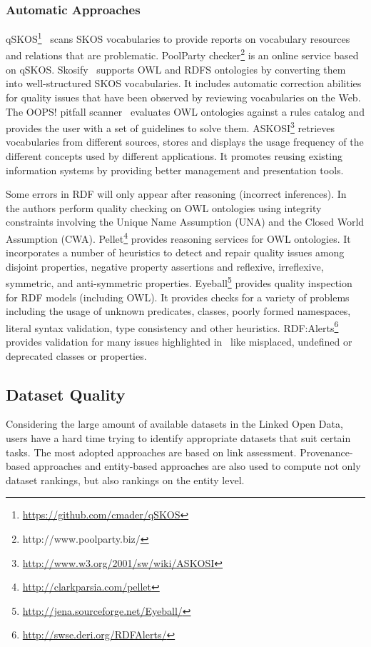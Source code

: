 \documentclass[onecolumn, crcready]{../../Util/LaTEX/iosart2c}
\begin{document}
\subsubsection{Automatic Approaches}
qSKOS\footnote{\url{https://github.com/cmader/qSKOS}}~\cite{Mader:TBDL:12} scans SKOS vocabularies to provide reports on vocabulary resources and relations that are problematic. PoolParty checker\footnote{http://www.poolparty.biz/} is an online service based on qSKOS. Skosify~\cite{Suominen:IKEM:12} supports OWL and RDFS ontologies by converting them into well-structured SKOS vocabularies. It includes automatic correction abilities for quality issues that have been observed by reviewing vocabularies on the Web. The OOPS! pitfall scanner~\cite{PovedaVillalon:EKAW:12} evaluates OWL ontologies against a rules catalog and provides the user with a set of guidelines to solve them. ASKOSI\footnote{\url{http://www.w3.org/2001/sw/wiki/ASKOSI}} retrieves vocabularies from different sources, stores and displays the usage frequency of the different concepts used by different applications. It promotes reusing existing information systems by providing better management and presentation tools.

Some errors in RDF will only appear after reasoning (incorrect inferences). In~\cite{Sirin:OWLED:08,Tao:HICSS:09} the authors perform quality checking on OWL ontologies using integrity constraints involving the Unique Name Assumption (UNA) and the Closed World Assumption (CWA). Pellet\footnote{\url{http://clarkparsia.com/pellet}} provides reasoning services for OWL ontologies. It incorporates a number of heuristics to detect and repair quality issues among disjoint properties, negative property assertions and reflexive, irreflexive, symmetric, and anti-symmetric properties. Eyeball\footnote{\url{http://jena.sourceforge.net/Eyeball/}} provides quality inspection for RDF models (including OWL). It provides checks for a variety of problems including the usage of unknown predicates, classes, poorly formed namespaces, literal syntax validation, type consistency and other heuristics. RDF:Alerts\footnote{\url{http://swse.deri.org/RDFAlerts/}} provides validation for many issues highlighted in~\cite{Hogan:LDOW:10} like misplaced, undefined or deprecated classes or properties.

\subsection{Dataset Quality}
Considering the large amount of available datasets in the Linked Open Data, users have a hard time trying to identify appropriate datasets that suit certain tasks. The most adopted approaches are based on link assessment. Provenance-based approaches and entity-based approaches are also used to compute not only dataset rankings, but also rankings on the entity level.
\end{document}
